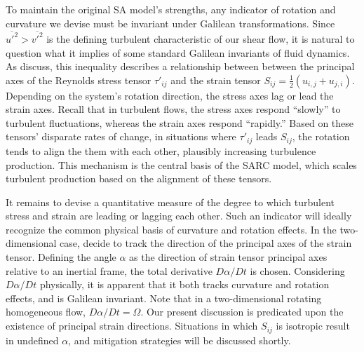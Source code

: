 \documentclass[11pt]{article}
\begin{document}
To maintain the original SA model's strengths, any indicator of rotation and curvature we devise must be invariant under Galilean transformations. Since $\overline{u'^2} > \overline{v'^2}$ is the defining turbulent characteristic of our shear flow, it is natural to question what it implies of some standard Galilean invariants of fluid dynamics. As \citet{spalart1997} discuss, this inequality describes a relationship between between the principal axes of the Reynolds stress tensor $\tau'_{ij}$ and the strain tensor $S_{ij} = \tfrac{1}{2} (u_{i,j} + u_{j,i})$. Depending on the system's rotation direction, the stress axes lag or lead the strain axes. Recall that in turbulent flows, the stress axes respond ``slowly'' to turbulent fluctuations, whereas the strain axes respond ``rapidly.'' Based on these tensors' disparate rates of change, in situations where $\tau'_{ij}$ leads $S_{ij}$, the rotation tends to align the them with each other, plausibly increasing turbulence production. This mechanism is the central basis of the SARC model, which scales turbulent production based on the alignment of these tensors.

It remains to devise a quantitative measure of the degree to which turbulent stress and strain are leading or lagging each other. Such an indicator will ideally recognize the common physical basis of curvature and rotation effects. In the two-dimensional case, \citet{spalart1997} decide to track the direction of the principal axes of the strain tensor. Defining the angle $\alpha$ as the direction of strain tensor principal axes relative to an inertial frame, the total derivative $D \alpha / D t$ is chosen. Considering $D \alpha / D t$ physically, it is apparent that it both tracks curvature and rotation effects, and is Galilean invariant. Note that in a two-dimensional rotating homogeneous flow, $D \alpha / D t = \Omega$. Our present discussion is predicated upon the existence of principal strain directions. Situations in which $S_{ij}$ is isotropic result in undefined $\alpha$, and mitigation strategies will be discussed shortly.
\end{document}
